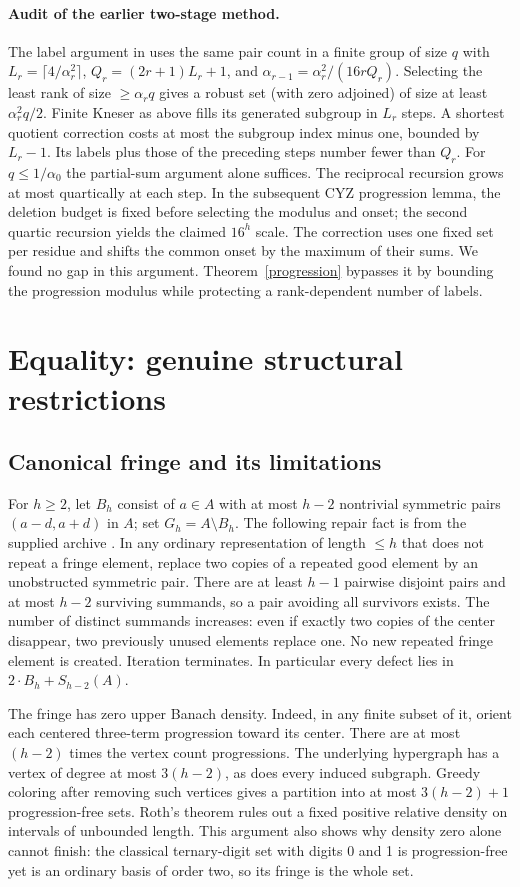 \documentclass[11pt]{article}
\theoremstyle{remark}\newtheorem{remark}[theorem]{Remark}
\begin{document}
\paragraph{Audit of the earlier two-stage method.} The label argument in \cite{Gao} uses the same pair count in a finite group of size $q$ with $L_r=\lceil4/\alpha_r^2\rceil$, $Q_r=(2r+1)L_r+1$, and $\alpha_{r-1}=\alpha_r^2/(16rQ_r)$. Selecting the least rank of size $\ge\alpha_r q$ gives a robust set (with zero adjoined) of size at least $\alpha_r^2q/2$. Finite Kneser as above fills its generated subgroup in $L_r$ steps. A shortest quotient correction costs at most the subgroup index minus one, bounded by $L_r-1$. Its labels plus those of the preceding steps number fewer than $Q_r$. For $q\le1/\alpha_0$ the partial-sum argument alone suffices. The reciprocal recursion grows at most quartically at each step. In the subsequent CYZ progression lemma, the deletion budget is fixed before selecting the modulus and onset; the second quartic recursion yields the claimed $16^h$ scale. The correction uses one fixed set per residue and shifts the common onset by the maximum of their sums. We found no gap in this argument. Theorem~\ref{progression} bypasses it by bounding the progression modulus while protecting a rank-dependent number of labels.

\section{Equality: genuine structural restrictions}
\subsection{Canonical fringe and its limitations}
For $h\ge2$, let $B_h$ consist of $a\in A$ with at most $h-2$ nontrivial symmetric pairs $(a-d,a+d)$ in $A$; set $G_h=A\setminus B_h$. The following repair fact is from the supplied archive \cite{archive}. In any ordinary representation of length $\le h$ that does not repeat a fringe element, replace two copies of a repeated good element by an unobstructed symmetric pair. There are at least $h-1$ pairwise disjoint pairs and at most $h-2$ surviving summands, so a pair avoiding all survivors exists. The number of distinct summands increases: even if exactly two copies of the center disappear, two previously unused elements replace one. No new repeated fringe element is created. Iteration terminates. In particular every defect lies in $2\cdot B_h+S_{h-2}(A)$.

The fringe has zero upper Banach density. Indeed, in any finite subset of it, orient each centered three-term progression toward its center. There are at most $(h-2)$ times the vertex count progressions. The underlying hypergraph has a vertex of degree at most $3(h-2)$, as does every induced subgraph. Greedy coloring after removing such vertices gives a partition into at most $3(h-2)+1$ progression-free sets. Roth's theorem rules out a fixed positive relative density on intervals of unbounded length. This argument also shows why density zero alone cannot finish: the classical ternary-digit set with digits 0 and 1 is progression-free yet is an ordinary basis of order two, so its fringe is the whole set.
\end{document}
